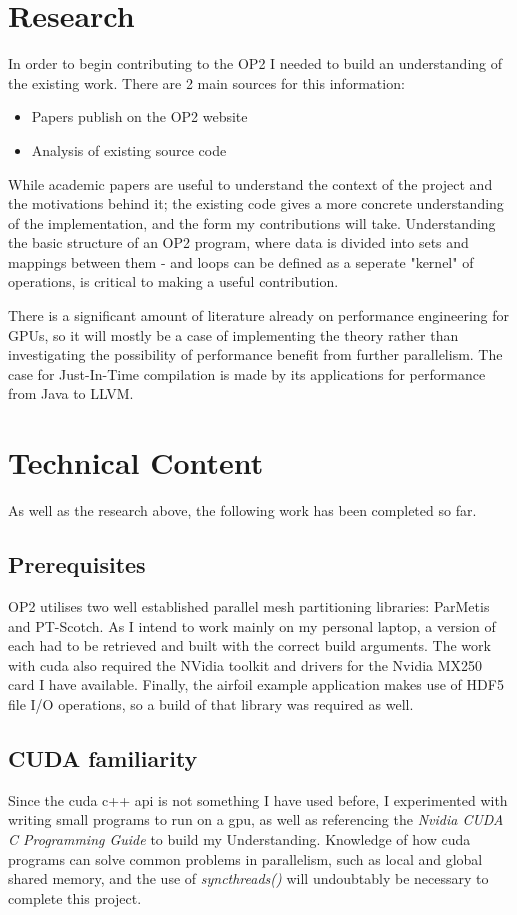 \documentclass[11pt]{article}
\begin{document}
\section*{Research}
In order to begin contributing to the OP2 I needed to build an understanding of the existing work. There are 2 main sources for this information:
\begin{itemize}
 \item{Papers publish on the OP2 website}
 \item{Analysis of existing source code}
\end{itemize}
While academic papers are useful to understand the context of the project and the motivations behind it; the existing code gives a more concrete understanding of the implementation, and the form my contributions will take. Understanding the basic structure of an OP2 program, where data is divided into sets and mappings between them - and loops can be defined as a seperate "kernel" of operations, is critical to making a useful contribution. 
\par There is a significant amount of literature already on performance engineering for GPUs, so it will mostly be a case of implementing the theory rather than investigating the possibility of performance benefit from further parallelism. The case for Just-In-Time compilation is made by its applications for performance from Java to LLVM.
\par 
\section*{Technical Content}
As well as the research above, the following work has been completed so far.
\subsection*{Prerequisites}
OP2 utilises two well established parallel mesh partitioning libraries: ParMetis and PT-Scotch. As I intend to work mainly on my personal laptop, a version of each had to be retrieved and built with the correct build arguments. The work with cuda also required the NVidia toolkit and drivers for the Nvidia MX250 card I have available. Finally, the airfoil example application makes use of HDF5 file I/O operations, so a build of that library was required as well. 

\subsection*{CUDA familiarity}
Since the cuda c++ api is not something I have used before, I experimented with writing small programs to run on a gpu, as well as referencing the \textit{Nvidia CUDA C Programming Guide} to build my Understanding. Knowledge of how cuda programs can solve common problems in parallelism, such as local and global shared memory, and the use of \textit{syncthreads()} will undoubtably be necessary to complete this project.
\end{document}
